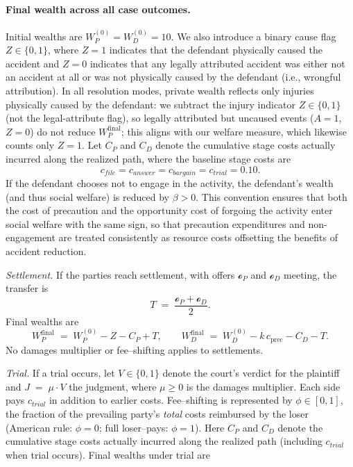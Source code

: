 \documentclass{article}
\begin{document}
\paragraph{Final wealth across all case outcomes.}
Initial wealths are $W_P^{(0)}=W_D^{(0)}=10$. We also introduce a binary cause flag $Z\in\{0,1\}$, where $Z=1$ indicates that the defendant physically caused the accident and $Z=0$ indicates that any legally attributed accident was either not an accident at all or was not physically caused by the defendant (i.e., wrongful attribution). In all resolution modes, private wealth reflects only injuries physically caused by the defendant: we subtract the injury indicator $Z\in\{0,1\}$ (not the legal-attribute flag), so legally attributed but uncaused events ($A=1$, $Z=0$) do not reduce $W_P^{\mathrm{final}}$; this aligns with our welfare measure, which likewise counts only $Z=1$.
Let $C_P$ and $C_D$ denote the cumulative stage costs actually incurred along the realized path, where the baseline stage costs are
\[
c_{file}=c_{answer}=c_{bargain}=c_{trial}=0.10.
\]
If the defendant chooses not to engage in the activity, the defendant's wealth (and thus social welfare) is reduced by $\beta > 0$. This convention ensures that both the cost of precaution and the opportunity cost of forgoing the activity enter social welfare with the same sign, so that precaution expenditures and non-engagement are treated consistently as resource costs offsetting the benefits of accident reduction.

\emph{Settlement.} If the parties reach settlement, with offers $\mathcal{o}_P$ and $\mathcal{o}_D$ meeting, the transfer is
\[
T \;=\; \frac{\mathcal{o}_P+\mathcal{o}_D}{2}.
\]
Final wealths are
\[
W_P^{\mathrm{final}} \;=\; W_P^{(0)} - Z - C_P + T,
\qquad
W_D^{\mathrm{final}} \;=\; W_D^{(0)} - k\,c_{\mathrm{prec}} - C_D - T.
\]
No damages multiplier or fee–shifting applies to settlements.

\emph{Trial.} If a trial occurs, let $V\in\{0,1\}$ denote the court’s verdict for the plaintiff and $J \;=\; \mu \cdot V$ the judgment, where $\mu\ge 0$ is the damages multiplier. Each side pays $c_{trial}$ in addition to earlier costs. Fee–shifting is represented by $\phi\in[0,1]$, the fraction of the prevailing party’s \emph{total} costs reimbursed by the loser (American rule: $\phi=0$; full loser–pays: $\phi=1$). Here $C_P$ and $C_D$ denote the cumulative stage costs actually incurred along the realized path (including $c_{trial}$ when trial occurs). Final wealths under trial are
\end{document}
